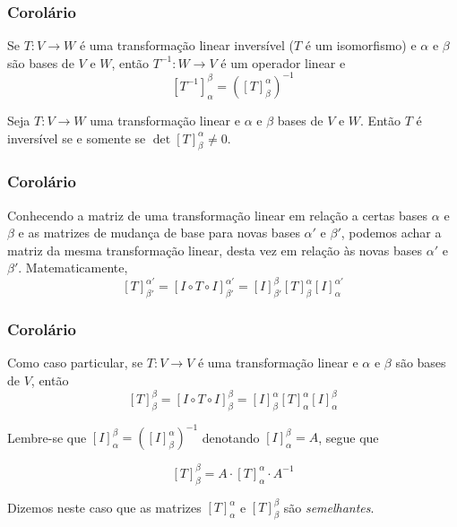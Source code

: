 \documentclass[hyperref={pdfpagelabels=false}]{beamer}
\begin{document}
\begin{frame}
\frametitle{Corolário}

\begin{corollary}
	Se $T: V \rightarrow W$ é uma transformação linear inversível ($T$ é um isomorfismo) e $\alpha$ e $\beta$ são bases de $V$ e $W$, então $T^{-1}:W \rightarrow V$ é um operador linear e 
	$$[T^{-1}]_{\alpha}^{\beta} = ([T]_{\beta}^{\alpha})^{-1}$$
\end{corollary}

\pause

\begin{corollary}
	Seja $T: V \rightarrow W$ uma transformação linear e $\alpha$ e $\beta$ bases de $V$ e $W$. Então $T$ é inversível se e somente se $\det[T]_{\beta}^{\alpha} \neq 0$.
\end{corollary}

\end{frame}

\begin{frame}
\frametitle{Corolário}

\begin{corollary}
	Conhecendo a matriz de uma transformação linear em relação a certas bases $\alpha$ e $\beta$ e as matrizes de mudança de base para novas bases $\alpha'$ e $\beta'$, podemos achar a matriz da mesma transformação linear, desta vez em relação às novas bases $\alpha'$ e $\beta'$. Matematicamente,
	$$[T]_{\beta'}^{\alpha'} = [I \circ T \circ I]_{\beta'}^{\alpha'} = [I]_{\beta'}^{\beta}[T]_{\beta}^{\alpha}[I]_{\alpha}^{\alpha'}$$
\end{corollary}

\end{frame}


\begin{frame}
\frametitle{Corolário}

Como caso particular, se $T: V \rightarrow V$ é uma transformação linear e $\alpha$ e $\beta$ são bases de $V$, então
$$[T]_{\beta}^{\beta} = [I \circ T \circ I]_{\beta}^{\beta} = [I]_{\beta}^{\alpha}[T]_{\alpha}^{\alpha}[I]_{\alpha}^{\beta}$$

Lembre-se que $[I]_{\alpha}^{\beta} = ([I]_{\beta}^{\alpha})^{-1}$ denotando $[I]_{\alpha}^{\beta} = A$, segue que

$$[T]_{\beta}^{\beta} = A \cdot [T]_{\alpha}^{\alpha} \cdot A^{-1}$$

Dizemos neste caso que as matrizes $[T]_{\alpha}^{\alpha}$ e $[T]_{\beta}^{\beta}$ são \emph{semelhantes}.

\end{frame}
\end{document}
